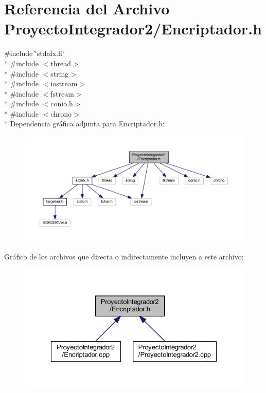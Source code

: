 \section{Referencia del Archivo Proyecto\-Integrador2/\-Encriptador.h}
\label{_encriptador_8h}
{\ttfamily \#include \char`\"{}stdafx.\-h\char`\"{}}\\*
{\ttfamily \#include $<$thread$>$}\\*
{\ttfamily \#include $<$string$>$}\\*
{\ttfamily \#include $<$iostream$>$}\\*
{\ttfamily \#include $<$fstream$>$}\\*
{\ttfamily \#include $<$conio.\-h$>$}\\*
{\ttfamily \#include $<$chrono$>$}\\*
Dependencia gráfica adjunta para Encriptador.\-h\-:
\nopagebreak
\begin{figure}[H]
\begin{center}
\leavevmode
\includegraphics[width=350pt]{_encriptador_8h__incl}
\end{center}
\end{figure}
Gráfico de los archivos que directa o indirectamente incluyen a este archivo\-:
\nopagebreak
\begin{figure}[H]
\begin{center}
\leavevmode
\includegraphics[width=327pt]{_encriptador_8h__dep__incl}
\end{center}
\end{figure}
